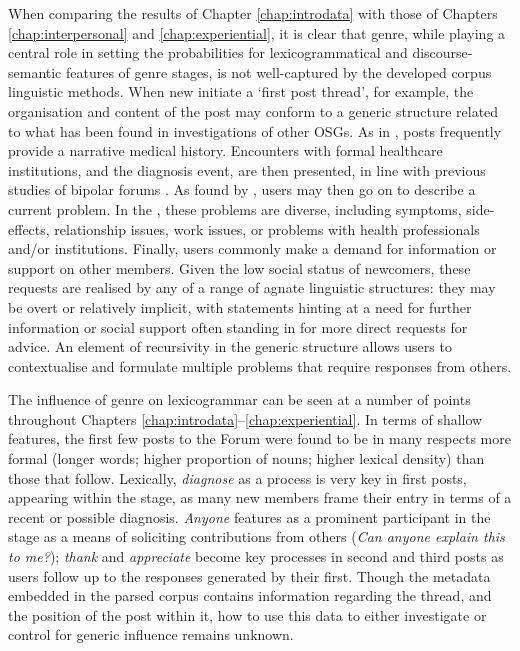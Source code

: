 When comparing the results of Chapter \ref{chap:introdata} with those of Chapters \ref{chap:interpersonal} and \ref{chap:experiential}, it is clear that genre, while playing a central role in setting the probabilities for lexicogrammatical and \gls{discourse-semantic} features of genre stages, is not well\hyp{}captured by the developed corpus linguistic methods. When new  initiate a `first \gls{post} \gls{thread}', for example, the organisation and content of the \gls{post} may conform to a generic structure related to what has been found in investigations of other \glspl{OSG}. As in \textcite{varga2014grieving}, \glspl{post} frequently provide a narrative medical history. Encounters with formal healthcare institutions, and the diagnosis event, are then presented, in line with previous studies of bipolar \glspl{forum} \cite[e.g.][]{vayreda_social_2009}. As found by \textcite{horne_doing_2009}, users may then go on to describe a current problem. In the , these problems are diverse, including symptoms, side\hyp{}effects, relationship issues, work issues, or problems with health professionals and\slash or institutions. Finally, users commonly make a demand for information or support on other members. Given the low social status of newcomers, these requests are realised by any of a range of agnate linguistic structures: they may be overt or relatively implicit, with statements hinting at a need for further information or social support often standing in for more direct requests for advice. An element of recursivity in the generic structure allows users to contextualise and formulate multiple problems that require responses from others.

The influence of genre on lexicogrammar can be seen at a number of points throughout Chapters \ref{chap:introdata}--\ref{chap:experiential}. In terms of shallow features, the first few \glspl{post} to the \gls{Forum} were found to be in many respects more formal (longer words; higher proportion of nouns; higher lexical density) than those that follow. Lexically, \emph{diagnose} as a process is very key in first \glspl{post}, appearing within the  stage, as many new \glspl{member} frame their entry in terms of a recent or possible diagnosis. \emph{Anyone} features as a prominent participant in the  stage as a means of soliciting contributions from others (\emph{Can anyone explain this to me?}); \emph{thank} and \emph{appreciate} become key processes in second and third posts as users follow up to the responses generated by their first. Though the metadata embedded in the parsed corpus contains information regarding the thread, and the position of the \gls{post} within it, how to use this data to either investigate or control for generic influence remains unknown.

